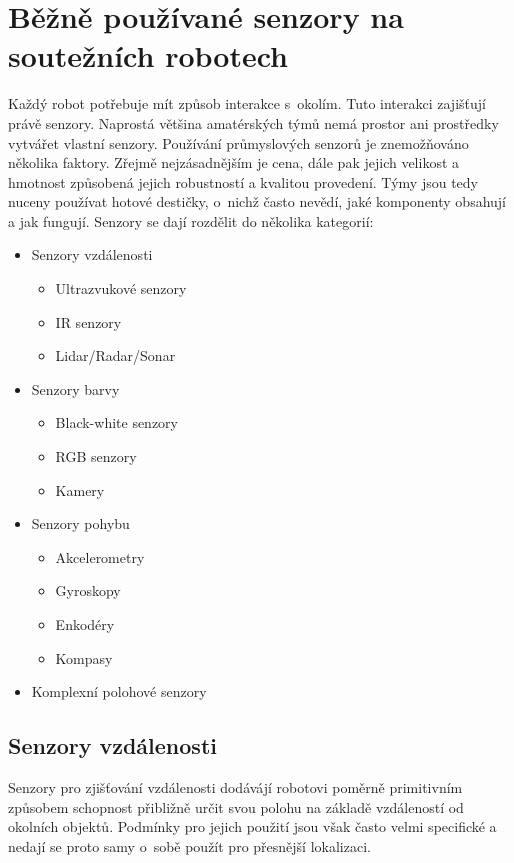 \chapter{Běžně používané senzory na soutežních robotech}

Každý robot potřebuje mít způsob interakce s~okolím.
Tuto interakci zajišťují právě senzory.
Naprostá většina amatérských týmů nemá prostor ani prostředky vytvářet vlastní senzory.
Používání průmyslových senzorů je znemožňováno několika faktory.
Zřejmě nejzásadnějším je cena, dále pak jejich velikost a hmotnost způsobená jejich robustností a kvalitou provedení.
Týmy jsou tedy nuceny používat hotové destičky, o~nichž často nevědí, jaké komponenty obsahují a jak fungují.
Senzory se dají rozdělit do několika kategorií:
\begin{itemize}
    \item Senzory vzdálenosti
        \begin{itemize}
            \item Ultrazvukové senzory
            \item IR senzory
            \item Lidar/Radar/Sonar
        \end{itemize}
    \item Senzory barvy
        \begin{itemize}
            \item Black-white senzory
            \item RGB senzory
            \item Kamery
        \end{itemize}
    \item Senzory pohybu
        \begin{itemize}
            \item Akcelerometry
            \item Gyroskopy
            \item Enkodéry
            \item Kompasy
        \end{itemize}
    \item Komplexní polohové senzory
\end{itemize}

\section{Senzory vzdálenosti}

Senzory pro zjišťování vzdálenosti dodávájí robotovi poměrně primitivním způsobem schopnost přibližně určit svou polohu na základě vzdáleností od okolních objektů.
Podmínky pro jejich použití jsou však často velmi specifické a nedají se proto samy o~sobě použít pro přesnější lokalizaci.

